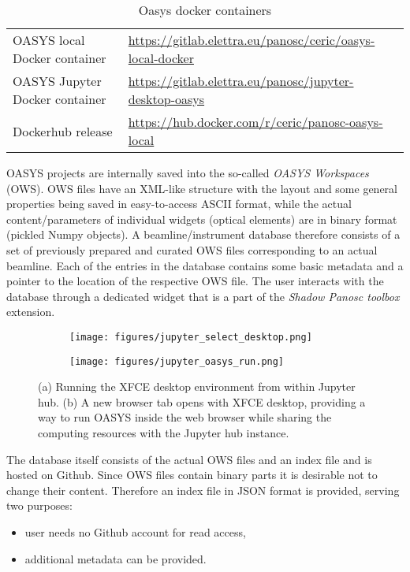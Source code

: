 \documentclass[10pt]{scrartcl}
\begin{document}
\begin{table}[ht]
  \label{tab:oasys_containers}
  \centering
  \begin{center}
    \caption{Oasys docker containers}
    \begin{tabular}{ll}
      \hline
      OASYS local Docker container & \url{https://gitlab.elettra.eu/panosc/ceric/oasys-local-docker} \\
      OASYS Jupyter Docker container & \url{https://gitlab.elettra.eu/panosc/jupyter-desktop-oasys} \\
      Dockerhub release & \url{https://hub.docker.com/r/ceric/panosc-oasys-local}\\
      \hline
    \end{tabular}
  \end{center}
\end{table}
% 
OASYS projects are internally saved into the so-called \emph{OASYS Workspaces} (OWS). OWS files have an XML-like structure with the layout and some general properties being saved in easy-to-access ASCII format, while the actual content/parameters of individual widgets (optical elements) are in binary format (pickled Numpy objects). A beamline/instrument database therefore consists of a set of previously prepared and curated OWS files corresponding to an actual beamline. Each of the entries in the database contains some basic metadata and a pointer to the location of the respective OWS file. The user interacts with the database through a dedicated widget that is a part of the \emph{Shadow Panosc toolbox} extension.
\begin{figure}[htb]
    \centering
    \begin{subfigure}{0.3\textwidth}
        \texttt{[image: figures/jupyter\_select\_desktop.png]}
        \caption{}
        \label{fig:jupyter_select}
    \end{subfigure}
    \hfil
    \begin{subfigure}{0.5\textwidth}
        \texttt{[image: figures/jupyter\_oasys\_run.png]}
        \caption{}
        \label{fig:oasys_run}
    \end{subfigure}%
    \caption{(a) Running the XFCE desktop environment from within Jupyter hub. (b) A new browser tab opens with XFCE desktop, providing a way to run OASYS inside the web browser while sharing the computing resources with the Jupyter hub instance.}
    \label{fig:oasysJupyter}
\end{figure}
The database itself consists of the actual OWS files and an index file and is hosted on Github. Since OWS files contain binary parts it is desirable not to change their content. Therefore an index file in JSON format is provided, serving two purposes:
\begin{itemize}
    \item user needs no Github account for read access,
    \item additional metadata can be provided.
\end{itemize}
\end{document}
